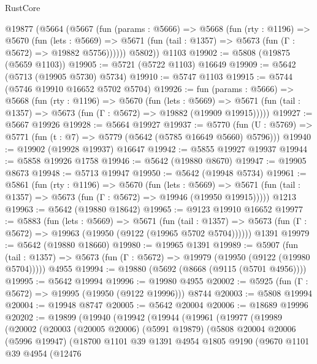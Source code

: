 \begin{lexlean}{RustCore}
\begin{coremodule}
    @19877
      (@5664
        (@5667
          (fun (params : @5666) =>
          @5668
            (fun (rty : @1196) =>
            @5670
              (fun (lets : @5669) =>
              @5671 (fun (tail : @1357) => @5673 (fun (Γ : @5672) => @19882 @5756))))))
        @5802))
    @1103
@19902 := @5808 (@19875 (@5659 @1103))
@19905 := @5721 (@5722 @1103) @16649
@19909 := @5642 (@5713 (@19905 @5730) @5734)
@19910 := @5747 @1103
@19915 := @5744 (@5746 @19910 @16652 @5702 @5704)
@19926 := fun (params : @5666) =>
  @5668
    (fun (rty : @1196) =>
    @5670
      (fun (lets : @5669) =>
      @5671 (fun (tail : @1357) => @5673 (fun (Γ : @5672) => @19882 (@19909 @19915)))))
@19927 := @5667 @19926
@19928 := @5664 @19927
@19937 := @5770
    (fun (U : @5769) => @5771 (fun (t : @7) => @5779 (@5642 (@5785 @16649 @5660) @5796)))
@19940 := @19902 (@19928 @19937) @16647
@19942 := @5855 @19927 @19937
@19944 := @5858 @19926 @1758
@19946 := @5642 (@19880 @8670)
@19947 := @19905 @8673
@19948 := @5713 @19947
@19950 := @5642 (@19948 @5734)
@19961 := @5861
    (fun (rty : @1196) =>
    @5670
      (fun (lets : @5669) =>
      @5671 (fun (tail : @1357) => @5673 (fun (Γ : @5672) => @19946 (@19950 @19915)))))
    @1213
@19963 := @5642 (@19880 @18642)
@19965 := @9123 @19910 @16652
@19977 := @5883
    (fun (lets : @5669) =>
    @5671
      (fun (tail : @1357) =>
      @5673 (fun (Γ : @5672) => @19963 (@19950 (@9122 (@19965 @5702 @5704))))))
    @1391
@19979 := @5642 (@19880 @18660)
@19980 := @19965 @1391
@19989 := @5907
    (fun (tail : @1357) => @5673 (fun (Γ : @5672) => @19979 (@19950 (@9122 (@19980 @5704)))))
    @4955
@19994 := @19880 (@5692 (@8668 (@9115 (@5701 @4956))))
@19995 := @5642 @19994
@19996 := @19980 @4955
@20002 := @5925 (fun (Γ : @5672) => @19995 (@19950 (@9122 @19996))) @8744
@20003 := @5808 @19994
@20004 := @19948 @8747
@20005 := @5642 @20004
@20006 := @18689 @19996
@20202 := @19899
    (@19940
      (@19942
        (@19944
          (@19961
            (@19977
              (@19989
                (@20002
                  (@20003
                    (@20005 @20006)
                    (@5991 @19879)
                    (@5808
                      @20004
                      @20006
                      (@5996 @19947)
                      (@18700
                        @1101
                        @39
                        @1391
                        @4954
                        @1805
                        @9190
                        (@9670
                          @1101
                          @39
                          @4954
                          (@12476

\end{coremodule}
\end{lexlean}
